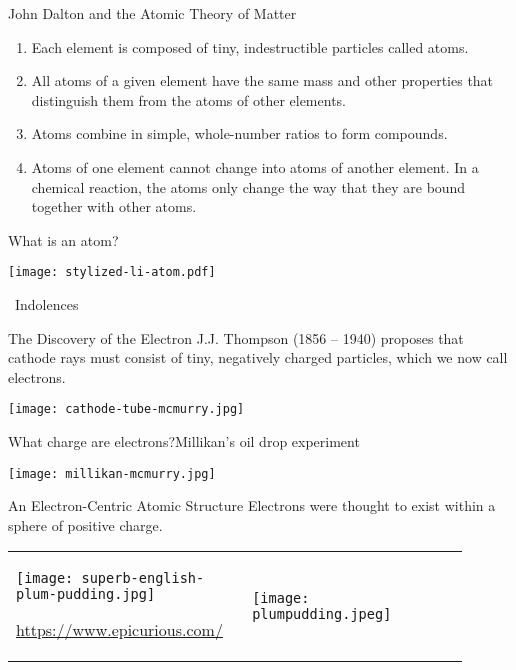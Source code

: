 \documentclass[10pt,letterpaper]{article}
\begin{document}
\begin{frame}{John Dalton and the Atomic Theory of Matter}
	\begin{enumerate}[<+->]
		\item Each element is composed of tiny, indestructible particles
			called atoms.
		\item All atoms of a given element have the same mass and other
			properties that distinguish them from the atoms of other
			elements.
		\item Atoms combine in simple, whole-number ratios to form
			compounds.
		\item Atoms of one element cannot change into atoms of another
			element. In a chemical reaction, the atoms only change
			the way that they are \alert{bound together} with other
			atoms.
	\end{enumerate}
\end{frame}

\begin{frame}{What is an atom?}
	\centering

	\texttt{[image: stylized-li-atom.pdf]}

	\bigskip

	\tiny\ccbysa\ Indolences
\end{frame}

\begin{frame}{The Discovery of the Electron}
	J.J. Thompson (1856 -- 1940) proposes that cathode rays must consist of
	tiny, negatively charged particles, which we now call \alert{electrons}.

	\begin{center}
		\texttt{[image: cathode-tube-mcmurry.jpg]}
	\end{center}
\end{frame}

\begin{frame}{What charge are electrons?}{Millikan's oil drop experiment}
	\begin{center}
		\texttt{[image: millikan-mcmurry.jpg]}
	\end{center}
\end{frame}

\begin{frame}{An Electron-Centric Atomic Structure}
	Electrons were thought to exist within a sphere of
	positive charge.

	\bigskip

	\begin{tabular} {m{0.45\linewidth}@{\qquad}m{0.45\linewidth}}
		\texttt{[image: superb-english-plum-pudding.jpg]}

		\tiny\url{https://www.epicurious.com/}
		& \texttt{[image: plumpudding.jpeg]} \\
	\end{tabular}
\end{frame}
\end{document}
